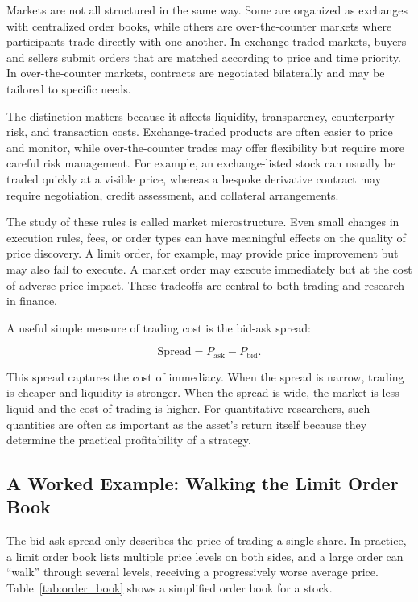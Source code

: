 \documentclass[../ai_in_finance]{subfiles}
\begin{document}
Markets are not all structured in the same way. Some are organized as exchanges with centralized order books, while others are over-the-counter markets where participants trade directly with one another. In exchange-traded markets, buyers and sellers submit orders that are matched according to price and time priority. In over-the-counter markets, contracts are negotiated bilaterally and may be tailored to specific needs.

The distinction matters because it affects liquidity, transparency, counterparty risk, and transaction costs. Exchange-traded products are often easier to price and monitor, while over-the-counter trades may offer flexibility but require more careful risk management. For example, an exchange-listed stock can usually be traded quickly at a visible price, whereas a bespoke derivative contract may require negotiation, credit assessment, and collateral arrangements.

The study of these rules is called market microstructure. Even small changes in execution rules, fees, or order types can have meaningful effects on the quality of price discovery. A limit order, for example, may provide price improvement but may also fail to execute. A market order may execute immediately but at the cost of adverse price impact. These tradeoffs are central to both trading and research in finance.

A useful simple measure of trading cost is the bid-ask spread:

\begin{equation*}
\text{Spread} = P_{\text{ask}} - P_{\text{bid}}.
\end{equation*}

This spread captures the cost of immediacy. When the spread is narrow, trading is cheaper and liquidity is stronger. When the spread is wide, the market is less liquid and the cost of trading is higher. For quantitative researchers, such quantities are often as important as the asset's return itself because they determine the practical profitability of a strategy.

\subsection{A Worked Example: Walking the Limit Order Book}
\label{sec:order-book-example}

The bid-ask spread only describes the price of trading a single share. In practice, a limit order book lists multiple price levels on both sides, and a large order can ``walk'' through several levels, receiving a progressively worse average price. Table~\ref{tab:order_book} shows a simplified order book for a stock.
\end{document}
